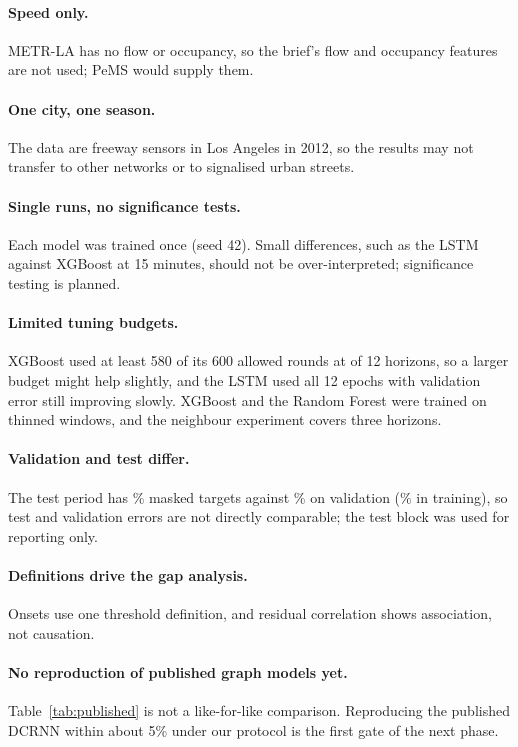 \documentclass[11pt,a4paper]{article}
\begin{document}
\paragraph{Speed only.}
METR-LA has no flow or occupancy, so the brief's flow and occupancy features are not used; PeMS would supply them.
\paragraph{One city, one season.}
The data are freeway sensors in Los Angeles in 2012, so the results may not transfer to other networks or to signalised urban streets.
\paragraph{Single runs, no significance tests.}
Each model was trained once (seed 42).
Small differences, such as the LSTM against XGBoost at 15 minutes, should not be over-interpreted; significance testing is planned.
\paragraph{Limited tuning budgets.}
XGBoost used at least 580 of its 600 allowed rounds at \XgbHighRoundHorizons{} of 12 horizons, so a larger budget might help slightly, and the LSTM used all 12 epochs with validation error still improving slowly.
XGBoost and the Random Forest were trained on thinned windows, and the neighbour experiment covers three horizons.
\paragraph{Validation and test differ.}
The test period has \MaskedTest\% masked targets against \MaskedVal\% on validation (\MaskedTrain\% in training), so test and validation errors are not directly comparable; the test block was used for reporting only.
\paragraph{Definitions drive the gap analysis.}
Onsets use one threshold definition, and residual correlation shows association, not causation.
\paragraph{No reproduction of published graph models yet.}
Table~\ref{tab:published} is not a like-for-like comparison.
Reproducing the published DCRNN within about 5\% under our protocol is the first gate of the next phase.
\end{document}
